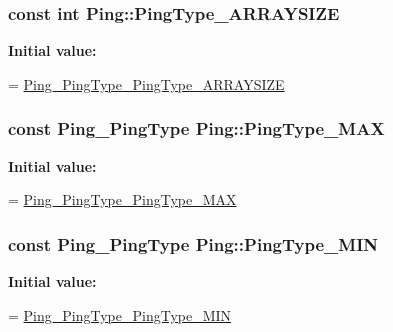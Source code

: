 \subsubsection[{\texorpdfstring{Ping\+Type\+\_\+\+A\+R\+R\+A\+Y\+S\+I\+ZE}{PingType_ARRAYSIZE}}]{\setlength{\rightskip}{0pt plus 5cm}const int Ping\+::\+Ping\+Type\+\_\+\+A\+R\+R\+A\+Y\+S\+I\+ZE\hspace{0.3cm}{\ttfamily [static]}}\hypertarget{class_ping_a8028a954d7d78d13fae083cb60e727b0}{}\label{class_ping_a8028a954d7d78d13fae083cb60e727b0}
{\bfseries Initial value\+:}
\begin{DoxyCode}
=
    \hyperlink{ping_8pb_8h_a21661a927a8719ad73a3ba29e88e8316}{Ping\_PingType\_PingType\_ARRAYSIZE}
\end{DoxyCode}
\subsubsection[{\texorpdfstring{Ping\+Type\+\_\+\+M\+AX}{PingType_MAX}}]{\setlength{\rightskip}{0pt plus 5cm}const {\bf Ping\+\_\+\+Ping\+Type} Ping\+::\+Ping\+Type\+\_\+\+M\+AX\hspace{0.3cm}{\ttfamily [static]}}\hypertarget{class_ping_a87cbddfca662688ece18233d43782221}{}\label{class_ping_a87cbddfca662688ece18233d43782221}
{\bfseries Initial value\+:}
\begin{DoxyCode}
=
    \hyperlink{ping_8pb_8h_a3efe69b5d92094b4c67ebb08bf983273}{Ping\_PingType\_PingType\_MAX}
\end{DoxyCode}
\subsubsection[{\texorpdfstring{Ping\+Type\+\_\+\+M\+IN}{PingType_MIN}}]{\setlength{\rightskip}{0pt plus 5cm}const {\bf Ping\+\_\+\+Ping\+Type} Ping\+::\+Ping\+Type\+\_\+\+M\+IN\hspace{0.3cm}{\ttfamily [static]}}\hypertarget{class_ping_aaae3c5a8ba3a462447872d8e64495b4f}{}\label{class_ping_aaae3c5a8ba3a462447872d8e64495b4f}
{\bfseries Initial value\+:}
\begin{DoxyCode}
=
    \hyperlink{ping_8pb_8h_a075eac15062ff637e6860f8b23c79448}{Ping\_PingType\_PingType\_MIN}
\end{DoxyCode}
